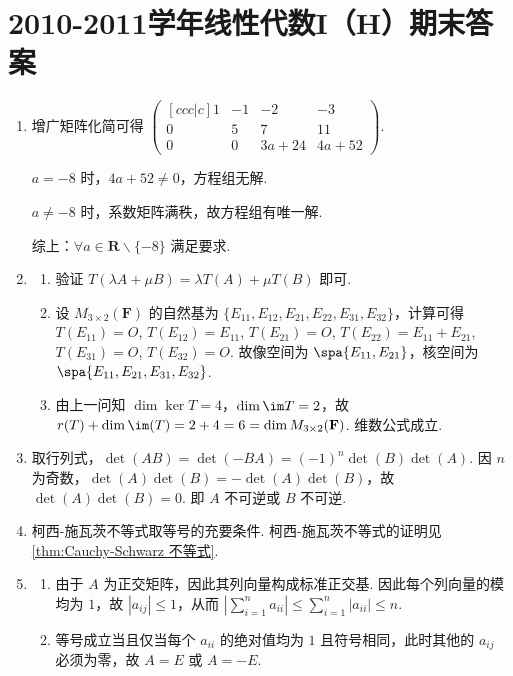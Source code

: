 \section{2010-2011学年线性代数I（H）期末答案}

\begin{enumerate}
    \item 增广矩阵化简可得 $\begin{pmatrix}[ccc|c]
        1 & -1 & -2 & -3 \\
        0 & 5 & 7 & 11 \\
        0 & 0 & 3a+24 & 4a+52
    \end{pmatrix}$.

    $a=-8$ 时，$4a+52 \neq 0$，方程组无解.

    $a\neq -8$ 时，系数矩阵满秩，故方程组有唯一解.

    综上：$\forall a \in \mathbf{R} \backslash \{-8\}$ 满足要求.

    \item
    \begin{enumerate}
        \item 验证 $T(\lambda A + \mu B) = \lambda T(A) + \mu T(B)$ 即可.
        \item 设 $M_{3\times 2}(\mathbf{F})$ 的自然基为 $\{E_{11}, E_{12}, E_{21}, E_{22}, E_{31}, E_{32}\}$，计算可得 $T(E_{11}) = O$, $T(E_{12}) = E_{11}$, $T(E_{21}) = O$, $T(E_{22}) = E_{11}+E_{21}$, $T(E_{31}) = O$, $T(E_{32}) = O$. 故像空间为 $\spa\{E_{11}, E_{21}\}$，核空间为 $\spa\{E_{11}, E_{21}, E_{31}, E_{32}\}$.
        \item 由上一问知 $\dim \ker T = 4$，$\dim \im T = 2$，故 $r(T) + \dim \im(T) = 2 + 4 = 6 = \dim M_{3 \times 2}(\mathbf{F})$. 维数公式成立.
    \end{enumerate}

    \item 取行列式，$\det(AB) = \det(-BA) = (-1)^n \det(B)\det(A)$. 因 $n$ 为奇数，$\det(A)\det(B) = - \det(A)\det(B)$，故 $\det(A)\det(B)=0$. 即 $A$ 不可逆或 $B$ 不可逆.

    \item 柯西-施瓦茨不等式取等号的充要条件. 柯西-施瓦茨不等式的证明见\autoref{thm:Cauchy-Schwarz 不等式}.

    \item
    \begin{enumerate}
        \item 由于 $A$ 为正交矩阵，因此其列向量构成标准正交基. 因此每个列向量的模均为 $1$，故 $|a_{ij}|\leqslant 1$，从而 $\left|\displaystyle\sum_{i=1}^n a_{ii}\right| \leqslant \displaystyle\sum_{i=1}^n |a_{ii}| \leqslant n$.
        \item 等号成立当且仅当每个 $a_{ii}$ 的绝对值均为 $1$ 且符号相同，此时其他的 $a_{ij}$ 必须为零，故 $A=E$ 或 $A=-E$.
    \end{enumerate}


\end{enumerate}
